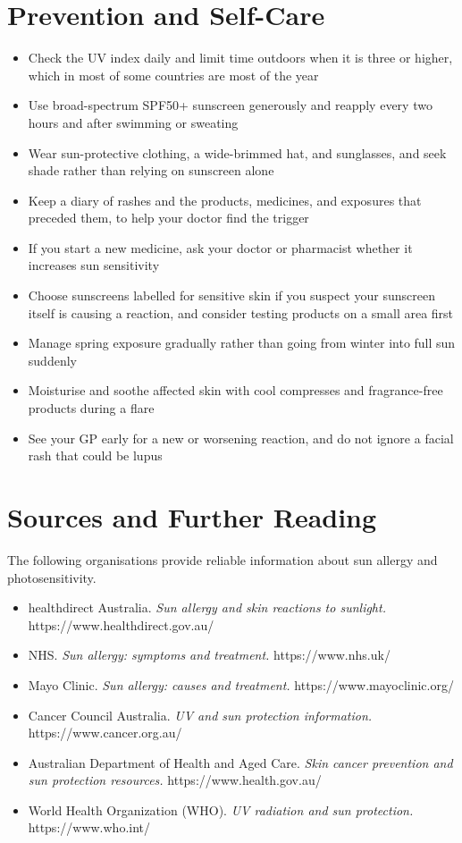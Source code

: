\section*{Prevention and Self-Care}
\begin{itemize}
    \item Check the UV index daily and limit time outdoors when it is three or higher, which in most of some countries are most of the year
    \item Use broad-spectrum SPF50+ sunscreen generously and reapply every two hours and after swimming or sweating
    \item Wear sun-protective clothing, a wide-brimmed hat, and sunglasses, and seek shade rather than relying on sunscreen alone
    \item Keep a diary of rashes and the products, medicines, and exposures that preceded them, to help your doctor find the trigger
    \item If you start a new medicine, ask your doctor or pharmacist whether it increases sun sensitivity
    \item Choose sunscreens labelled for sensitive skin if you suspect your sunscreen itself is causing a reaction, and consider testing products on a small area first
    \item Manage spring exposure gradually rather than going from winter into full sun suddenly
    \item Moisturise and soothe affected skin with cool compresses and fragrance-free products during a flare
    \item See your GP early for a new or worsening reaction, and do not ignore a facial rash that could be lupus
\end{itemize}

\section*{Sources and Further Reading}
The following organisations provide reliable information about sun allergy and photosensitivity.

\begin{itemize}
    \item healthdirect Australia. \textit{Sun allergy and skin reactions to sunlight.} https://www.healthdirect.gov.au/
    \item NHS. \textit{Sun allergy: symptoms and treatment.} https://www.nhs.uk/
    \item Mayo Clinic. \textit{Sun allergy: causes and treatment.} https://www.mayoclinic.org/
    \item Cancer Council Australia. \textit{UV and sun protection information.} https://www.cancer.org.au/
    \item Australian Department of Health and Aged Care. \textit{Skin cancer prevention and sun protection resources.} https://www.health.gov.au/
    \item World Health Organization (WHO). \textit{UV radiation and sun protection.} https://www.who.int/
\end{itemize}

\clearpage
